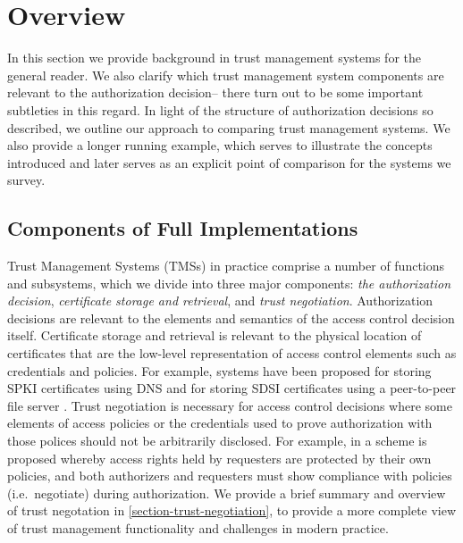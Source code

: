 \section{Overview}
\label{section-overview}

In this section we provide background in trust management systems for
the general reader.  We also clarify which trust management system
components are relevant to the authorization decision-- there turn out
to be some important subtleties in this regard.  In light of the
structure of authorization decisions so described, we outline our
approach to comparing trust management systems.  We also provide a
longer running example, which serves to illustrate the concepts
introduced and later serves as an explicit point of comparison
for the systems we survey.

\subsection{Components of Full Implementations}
\label{section-overview-components}

Trust Management Systems (TMSs) in practice comprise a number of
functions and subsystems, which we divide into three major components:
\emph{the authorization decision}, \emph{certificate storage and
retrieval}, and \emph{trust negotiation}.  Authorization decisions are
relevant to the elements and semantics of the access control decision
itself.  Certificate storage and retrieval is relevant to the physical
location of certificates that are the low-level representation of
access control elements such as credentials and policies.  For
example, systems have been proposed for storing SPKI certificates
using DNS \cite{nikander98storing} and for storing SDSI certificates using a
peer-to-peer file server \cite{ajmani02conchord}.  Trust negotiation
\cite{Winsborough:ATN,Yu:PECSATNI,Seamons:LDACPATN,Yu:ISATN,Winsborough:TPATN,Winsborough:SATN}
is necessary for access control decisions where some elements of access
policies or the credentials used to prove authorization with those polices
should not be arbitrarily disclosed. For example, in \cite{Winsborough:ATN}
a scheme is proposed whereby access rights held by requesters are protected
by their own policies, and both authorizers and requesters must show
compliance with policies (i.e.~negotiate) during authorization.  
We provide a brief summary and overview of trust negotation in 
\autoref{section-trust-negotiation}, to provide a more complete 
view of trust management functionality and challenges in modern practice.

